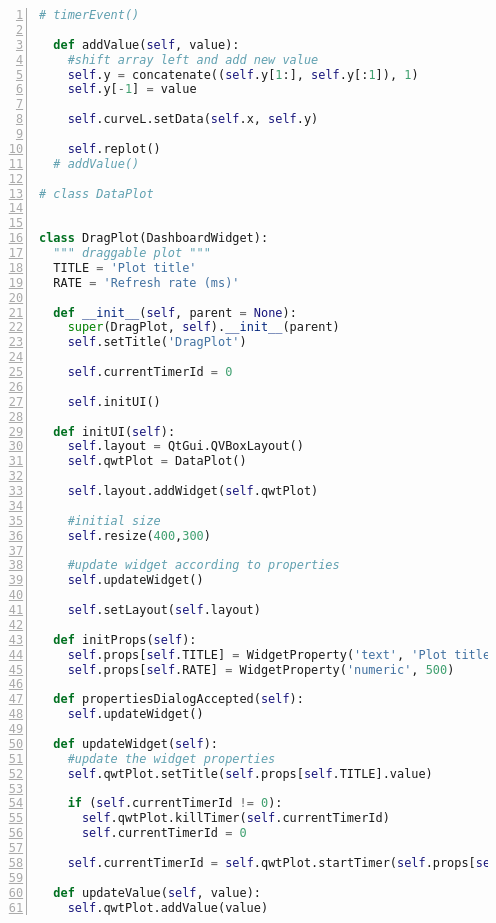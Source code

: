 \begin{lstlisting}[frame=single,caption={DragPlot implementation.},label=drag_plot_implementation,language=Python,numbers=left,breaklines=true]
  # timerEvent()

  def addValue(self, value):
    #shift array left and add new value
    self.y = concatenate((self.y[1:], self.y[:1]), 1)
    self.y[-1] = value

    self.curveL.setData(self.x, self.y)

    self.replot()
  # addValue()

# class DataPlot


class DragPlot(DashboardWidget):
  """ draggable plot """
  TITLE = 'Plot title'
  RATE = 'Refresh rate (ms)'
  
  def __init__(self, parent = None):
    super(DragPlot, self).__init__(parent)
    self.setTitle('DragPlot')
    
    self.currentTimerId = 0
    
    self.initUI()
      
  def initUI(self):
    self.layout = QtGui.QVBoxLayout()
    self.qwtPlot = DataPlot()
    
    self.layout.addWidget(self.qwtPlot)
    
    #initial size
    self.resize(400,300)
    
    #update widget according to properties
    self.updateWidget()
    
    self.setLayout(self.layout)
      
  def initProps(self):
    self.props[self.TITLE] = WidgetProperty('text', 'Plot title')
    self.props[self.RATE] = WidgetProperty('numeric', 500)
  
  def propertiesDialogAccepted(self):
    self.updateWidget()

  def updateWidget(self):
    #update the widget properties
    self.qwtPlot.setTitle(self.props[self.TITLE].value)

    if (self.currentTimerId != 0):
      self.qwtPlot.killTimer(self.currentTimerId)
      self.currentTimerId = 0

    self.currentTimerId = self.qwtPlot.startTimer(self.props[self.RATE].value)
      
  def updateValue(self, value):
    self.qwtPlot.addValue(value)
\end{lstlisting}

\newpage

